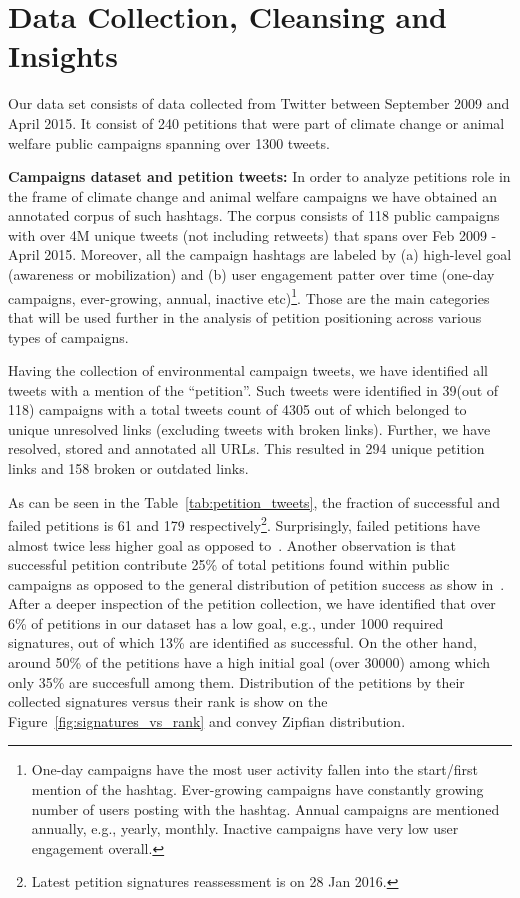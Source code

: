 \section{Data Collection, Cleansing and Insights}
\label{sec:dataset}

Our data set consists of data collected from Twitter between September 2009 and April 2015. It consist of 240 petitions that were part of climate change or animal welfare public campaigns spanning over 1300 tweets.

\textbf{Campaigns dataset and petition tweets:}
In order to analyze petitions role in the frame of climate change and animal welfare campaigns we have obtained an annotated corpus of such hashtags.
The corpus consists of 118 public campaigns with over 4M unique tweets (not including retweets) that spans over Feb 2009 - April 2015. Moreover, all the campaign hashtags are labeled by (a) high-level goal (awareness or mobilization) and (b) user engagement patter over time (one-day campaigns, ever-growing, annual, inactive etc)\footnote{One-day campaigns have the most user activity fallen into the start/first mention of the hashtag. Ever-growing campaigns have constantly growing number of users posting with the hashtag. Annual campaigns are mentioned annually, e.g., yearly, monthly. Inactive campaigns have very low user engagement overall.}.
Those are the main categories that will be used further in the analysis of petition positioning across various types of campaigns.

Having the collection of environmental campaign tweets, we have identified all tweets with a mention of the ``petition''. Such tweets were identified in 39(out of 118) campaigns with a total tweets count of 4305 out of which belonged to unique unresolved links (excluding tweets with broken links).
Further, we have resolved, stored and annotated all URLs. This resulted in 294 unique petition links and 158 broken or outdated links.

As can be seen in the Table~\ref{tab:petition_tweets}, the fraction of successful and failed petitions is 61 and 179 respectively\footnote{Latest petition signatures reassessment is on 28 Jan 2016.}. Surprisingly, failed petitions have almost twice less higher goal as opposed to~\cite{Etter2013}. Another observation is that successful petition contribute 25\% of total petitions found within public campaigns as opposed to the general distribution of petition success as show in~\cite{???}.
After a deeper inspection of the petition collection, we have identified that over 6\% of petitions in our dataset has a low goal, e.g., under 1000 required signatures, out of which 13\% are identified as successful.
On the other hand, around 50\% of the petitions have a high initial goal (over \num{30000}) among which only 35\% are succesfull among them.
Distribution of the petitions by their collected signatures versus their rank is show on the Figure~\ref{fig:signatures_vs_rank} and convey Zipfian distribution.

